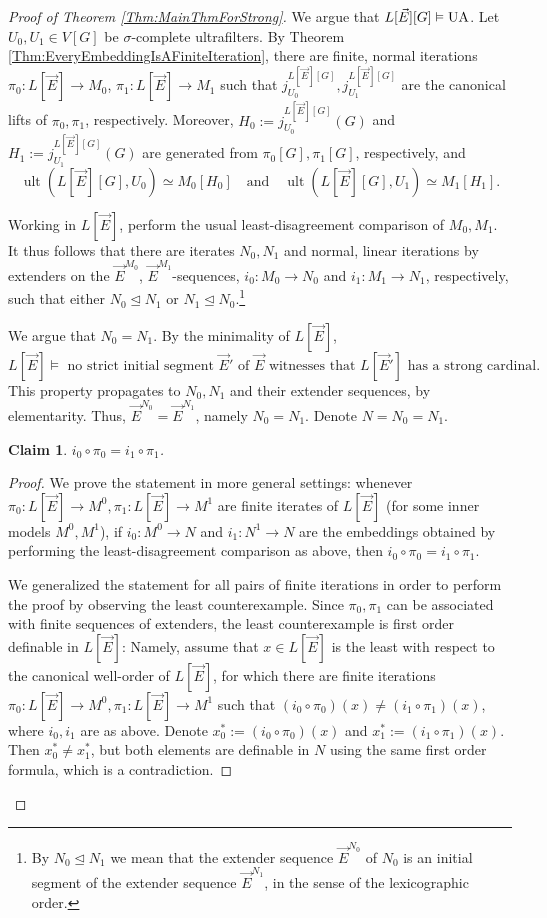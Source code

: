\documentclass{article}
\theoremstyle{definition}
\theoremstyle{plain}
\newtheorem{claim}[definition]{Claim}
\DeclareMathOperator{\Ult}{ult}
\begin{document}
\begin{proof}[Proof of Theorem \ref{Thm:MainThmForStrong}]
    We argue that $L[\vec{E}][G]\vDash {\rm UA}$. Let $U_0, U_1\in V[G]$ be $\sigma$-complete ultrafilters. By Theorem \ref{Thm:EveryEmbeddingIsAFiniteIteration}, there are finite, normal iterations $\pi_0\colon L[\vec E]\to M_0$, $\pi_1\colon L[\vec E]\to M_1$ such that $j^{L[\vec E][G]}_{U_0}, j^{L[\vec E][G]}_{U_1}$ are the canonical lifts of $\pi_0, \pi_1$, respectively. Moreover, $H_0:=j^{L[\vec E][G]}_{U_0}(G)$ and $H_1:=j^{L[\vec E][G]}_{U_1}(G)$ are generated from $\pi_0[G], \pi_1[G]$, respectively, and
    $$ \Ult(L[\vec E][G], U_0)\simeq M_0[H_0] \quad \text{and} \quad \Ult( L[\vec E][G], U_1 )\simeq M_1[H_1].$$
    
    Working in $L[\vec{E}]$, perform the usual least-disagreement comparison of $M_0, M_1$. It thus follows that there are  iterates $N_0, N_1$ and normal, linear iterations by extenders on the ${\vec E}^{M_0}$, ${\vec{E}}^{M_1}$-sequences, $i_0\colon M_0\to N_0$ and $i_1\colon M_1\to N_1$, respectively, such that either $N_0\unlhd N_1$ or $N_1\unlhd N_0$.\footnote{By $N_0\unlhd N_1$ we mean that the extender sequence $\vec{E}^{N_0}$ of $N_0$ is an initial segment of the extender sequence $\vec{E}^{N_1}$, in the sense of the lexicographic order.}
    
    We argue that $N_0 = N_1$. By the minimality of $L[\vec{E}]$,  
    $$L[\vec{E}]\vDash \text{ no strict initial segment $\vec{E}'$ of }\vec{E} \text{ witnesses that }L[\vec{E}'] \text{ has a strong cardinal}.$$
    This property propagates to $N_0, N_1$ and their extender sequences, by elementarity. Thus, $\vec{E}^{N_0} = \vec{E}^{N_1}$, namely $N_0 = N_1$. Denote $N = N_0 = N_1$. 

    \begin{claim}
        $i_0\circ \pi_0 = i_1\circ \pi_1$.
    \end{claim}

    \begin{proof}
        We prove the statement in more general settings: whenever $\pi_0\colon L[\vec{E}]\to M^0, \pi_1\colon L[\vec{E}]\to M^1$ are finite iterates of $L[\vec{E}]$ (for some inner models $M^0, M^1$), if $i_0\colon M^0\to N$ and $i_1\colon N^1\to N$ are the embeddings obtained by performing the least-disagreement comparison as above, then $i_0\circ \pi_0 = i_1\circ \pi_1$.

        We generalized the statement for all pairs of finite iterations in order to perform the proof by observing the least counterexample. Since $\pi_0, \pi_1$ can be associated with finite sequences of extenders, the least counterexample is first order definable in $L[\vec{E}]$: Namely, assume that $x\in L[\vec{E}]$ is the least with respect to the canonical well-order of $L[\vec{E}]$, for which there are finite iterations $\pi_0\colon L[\vec{E}]\to M^0, \pi_1\colon L[\vec{E}]\to M^1$ such that $(i_0\circ \pi_0)(x)\neq (i_1\circ \pi_1)(x)$, where $i_0, i_1$ are as above. Denote $x^*_0:=(i_0\circ \pi_0)(x)$ and $x^*_1:= (i_1\circ \pi_1)(x)$. Then $x^*_0\neq x^*_1$, but both elements are definable in $N$ using the same first order formula, which is a contradiction.
    \end{proof}


\end{proof}
\end{document}
